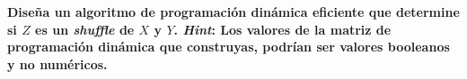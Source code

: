\textbf{Dise\~na un algoritmo de programaci\'on din\'amica eficiente que determine si $Z$ es un \textit{shuffle} de $X$ y $Y$. \textit{Hint}: Los valores de la matriz de programaci\'on din\'amica que construyas, podr\'ian ser valores booleanos y no num\'ericos.}\vspace{.2cm}

\textcolor{bibi}{}
\begin{quote}
\end{quote}